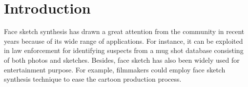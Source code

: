 \documentclass[10pt,twocolumn,letterpaper]{article}
\begin{document}
\section{Introduction}

Face sketch synthesis has drawn a great attention from the community in recent years because of its wide range of applications. For instance, it can be exploited in law enforcement for identifying suspects from a mug shot database consisting of both photos and sketches. Besides, face sketch has also been widely used for entertainment purpose. For example, filmmakers could employ face sketch synthesis technique to ease the cartoon production process.

\begin{figure}[t]
\centering
{}

\end{figure}
\end{document}
